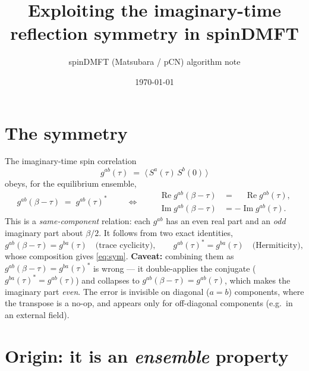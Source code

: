 \documentclass[11pt]{article}
\title{Exploiting the imaginary-time reflection symmetry in spinDMFT}
\author{spinDMFT (Matsubara / pCN) algorithm note}
\date{\today}
\newcommand{\g}{g}
\newcommand{\bt}{\beta}
\begin{document}
\maketitle

\section{The symmetry}

The imaginary-time spin correlation
\begin{equation}
  \g^{ab}(\tau) \;=\; \big\langle\, S^a(\tau)\, S^b(0)\,\big\rangle
\end{equation}
obeys, for the equilibrium ensemble,
\begin{equation}
  \boxed{\;\g^{ab}(\bt-\tau) \;=\; \g^{ab}(\tau)^{*}\;}
  \qquad\Longleftrightarrow\qquad
  \begin{aligned}
    \operatorname{Re}\g^{ab}(\bt-\tau) &= \phantom{-}\operatorname{Re}\g^{ab}(\tau),\\
    \operatorname{Im}\g^{ab}(\bt-\tau) &= -\operatorname{Im}\g^{ab}(\tau).
  \end{aligned}
  \label{eq:sym}
\end{equation}
This is a \emph{same-component} relation: each $\g^{ab}$ has an even real part and an
\emph{odd} imaginary part about $\bt/2$. It follows from two exact identities,
\begin{equation}
  \g^{ab}(\bt-\tau) = \g^{ba}(\tau)\quad\text{(trace cyclicity)},
  \qquad
  \g^{ab}(\tau)^{*} = \g^{ba}(\tau)\quad\text{(Hermiticity)},
  \label{eq:twoid}
\end{equation}
whose composition gives \eqref{eq:sym}. \textbf{Caveat:} combining them as
$\g^{ab}(\bt-\tau)=\g^{ba}(\tau)^{*}$ is wrong --- it double-applies the conjugate
($\g^{ba}(\tau)^{*}=\g^{ab}(\tau)$) and collapses to
$\g^{ab}(\bt-\tau)=\g^{ab}(\tau)$, which makes the imaginary part \emph{even}. The
error is invisible on diagonal ($a=b$) components, where the transpose is a no-op, and
appears only for off-diagonal components (e.g.\ in an external field).

\section{Origin: it is an \emph{ensemble} property}
\end{document}
